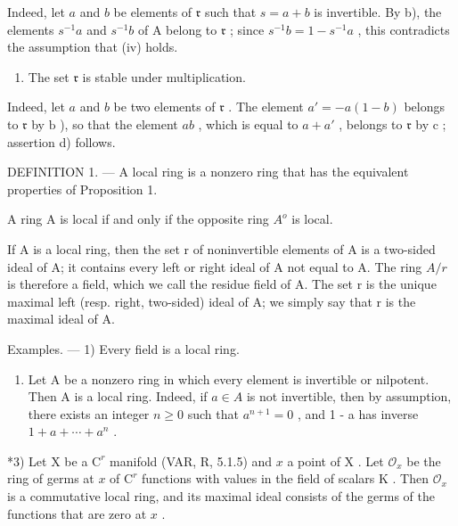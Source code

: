 Indeed, let \(a\) and \(b\) be elements of \(\mathfrak{r}\) such that \(s = a + b\) is invertible. By b), the elements \(s^{-1}a\) and \(s^{-1}b\) of A belong to \(\mathfrak{r}\) ; since \(s^{-1}b = 1 - s^{-1}a\) , this contradicts the assumption that (iv) holds.

\begin{enumerate}
\def\labelenumi{\alph{enumi})}
\setcounter{enumi}{3}
\tightlist
\item
  The set \(\mathfrak{r}\) is stable under multiplication.
\end{enumerate}

Indeed, let \(a\) and \(b\) be two elements of \(\mathfrak{r}\) . The element \(a' = -a(1 - b)\) belongs to \(\mathfrak{r}\) by \(\mathrm{b}\) ), so that the element \(ab\) , which is equal to \(a + a'\) , belongs to \(\mathfrak{r}\) by \(\mathrm{c}\) ; assertion d) follows.

DEFINITION 1. --- A local ring is a nonzero ring that has the equivalent properties of Proposition 1.

A ring A is local if and only if the opposite ring \(A^{o}\) is local.

If A is a local ring, then the set r of noninvertible elements of A is a two-sided ideal of A; it contains every left or right ideal of A not equal to A. The ring \(A/r\) is therefore a field, which we call the residue field of A. The set r is the unique maximal left (resp. right, two-sided) ideal of A; we simply say that r is the maximal ideal of A.

Examples. --- 1) Every field is a local ring.

\begin{enumerate}
\def\labelenumi{\arabic{enumi})}
\setcounter{enumi}{1}
\tightlist
\item
  Let A be a nonzero ring in which every element is invertible or nilpotent. Then A is a local ring. Indeed, if \(a \in A\) is not invertible, then by assumption, there exists an integer \(n \geqslant 0\) such that \(a^{n+1} = 0\) , and 1 - a has inverse \(1 + a + \cdots + a^{n}\) .
\end{enumerate}

*3) Let \(\mathrm{X}\) be a \(\mathrm{C}^r\) manifold (VAR, R, 5.1.5) and \(x\) a point of \(\mathrm{X}\) . Let \(\mathcal{O}_x\) be the ring of germs at \(x\) of \(\mathrm{C}^r\) functions with values in the field of scalars \(\mathrm{K}\) . Then \(\mathcal{O}_x\) is a commutative local ring, and its maximal ideal consists of the germs of the functions that are zero at \(x\) .

